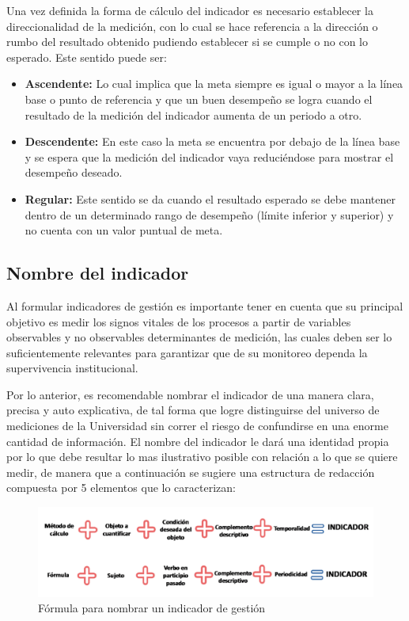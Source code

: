 \documentclass[
]{book}
\begin{document}
Una vez definida la forma de cálculo del indicador es necesario establecer la direccionalidad de la medición, con lo cual se hace referencia a la dirección o rumbo del resultado obtenido pudiendo establecer si se cumple o no con lo esperado. Este sentido puede ser:

\begin{itemize}
\item
  \textbf{Ascendente:} Lo cual implica que la meta siempre es igual o mayor a la línea base o punto de referencia y que un buen desempeño se logra cuando el resultado de la medición del indicador aumenta de un periodo a otro.
\item
  \textbf{Descendente:} En este caso la meta se encuentra por debajo de la línea base y se espera que la medición del indicador vaya reduciéndose para mostrar el desempeño deseado.
\item
  \textbf{Regular:} Este sentido se da cuando el resultado esperado se debe mantener dentro de un determinado rango de desempeño (límite inferior y superior) y no cuenta con un valor puntual de meta.
\end{itemize}

\hypertarget{nombre-del-indicador}{%
\subsection{Nombre del indicador}\label{nombre-del-indicador}}

Al formular indicadores de gestión es importante tener en cuenta que su principal objetivo es medir los signos vitales de los procesos a partir de variables observables y no observables determinantes de medición, las cuales deben ser lo suficientemente relevantes para garantizar que de su monitoreo dependa la supervivencia institucional.

Por lo anterior, es recomendable nombrar el indicador de una manera clara, precisa y auto explicativa, de tal forma que logre distinguirse del universo de mediciones de la Universidad sin correr el riesgo de confundirse en una enorme cantidad de información. El nombre del indicador le dará una identidad propia por lo que debe resultar lo mas ilustrativo posible con relación a lo que se quiere medir, de manera que a continuación se sugiere una estructura de redacción compuesta por 5 elementos que lo caracterizan:

\begin{figure}

{\centering \includegraphics[width=0.9\linewidth]{Imagenes/figura_15} 

}

\caption{Fórmula para nombrar un indicador de gestión}\label{fig:unnamed-chunk-11}
\end{figure}
\end{document}
